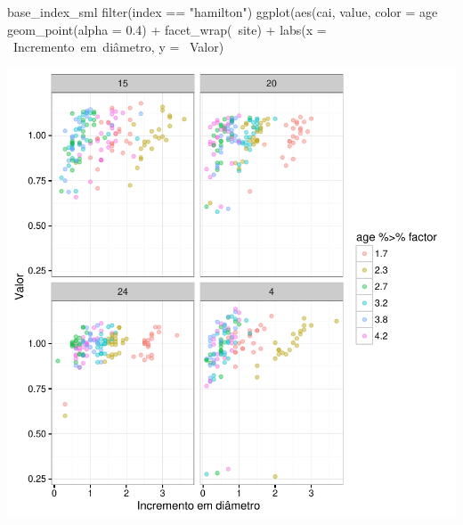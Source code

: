 \documentclass[article]{jss}
\begin{document}
\begin{CodeChunk}
\begin{CodeInput}
base_index_sml %
  filter(index == "hamilton") %
  ggplot(aes(cai, value, color = age %
    geom_point(alpha = 0.4) +
    facet_wrap(~site) +
    labs(x = ~Incremento~em~diâmetro, y = ~Valor)
\end{CodeInput}


\begin{center}\includegraphics{comp3-paper_files/figure-latex/disp_hamilton-1} \end{center}

\end{CodeChunk}
\end{document}
